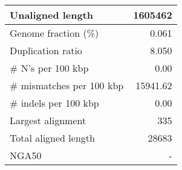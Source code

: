 \documentclass[12pt,a4paper]{article}
\begin{document}
\begin{table}[ht]
\begin{center}
\begin{tabular}{|l*{1}{|r}|}
Unaligned length & 1605462 \\ \hline
Genome fraction (\%) & 0.061 \\ \hline
Duplication ratio & 8.050 \\ \hline
\# N's per 100 kbp & 0.00 \\ \hline
\# mismatches per 100 kbp & 15941.62 \\ \hline
\# indels per 100 kbp & 0.00 \\ \hline
Largest alignment & 335 \\ \hline
Total aligned length & 28683 \\ \hline
NGA50 & - \\ \hline
\end{tabular}
\end{center}
\end{table}
\end{document}
